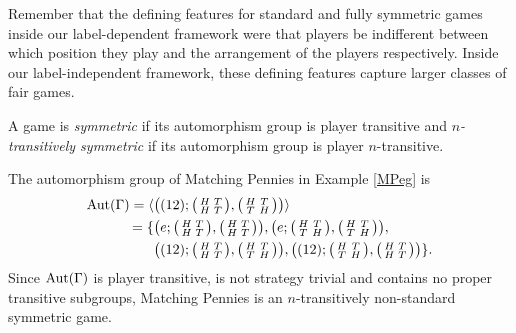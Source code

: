 Remember that the defining features for standard and fully symmetric games inside our label-dependent framework were that players be indifferent between which position they play and the arrangement of the players respectively. Inside our label-independent framework, these defining features capture larger classes of fair games.

\begin{definition}
	A game is \textit{symmetric} \cite{NoahXE} if its automorphism group is player transitive and \textit{$n$-transitively symmetric} if its automorphism group is player $n$-transitive.
\end{definition}

\begin{example} The automorphism group of Matching Pennies in Example \ref{MPeg} is \begin{align*}
		\operatorname*{Aut}(\Gamma) = \langle &\bigl((12) ; \bigl(\begin{smallmatrix} H & T \\ H & T \end{smallmatrix}\bigr), \bigl(\begin{smallmatrix} H & T \\ T & H \end{smallmatrix}\bigr)\bigr)\rangle \\
		= \{ &\bigl(e ; \bigl(\begin{smallmatrix} H & T \\ H & T \end{smallmatrix}\bigr), \bigl(\begin{smallmatrix} H & T \\ H & T \end{smallmatrix}\bigr)\bigr), 
		\bigl(e ; \bigl(\begin{smallmatrix} H & T \\ T & H \end{smallmatrix}\bigr), \bigl(\begin{smallmatrix} H & T \\ T & H \end{smallmatrix}\bigr)\bigr), \\
		&\bigl((12) ; \bigl(\begin{smallmatrix} H & T \\ H & T \end{smallmatrix}\bigr), \bigl(\begin{smallmatrix} H & T \\ T & H \end{smallmatrix}\bigr)\bigr),
		\bigl((12) ; \bigl(\begin{smallmatrix} H & T \\ T & H \end{smallmatrix}\bigr), \bigl(\begin{smallmatrix} H & T \\ H & T \end{smallmatrix}\bigr)\bigr) \}.
	\end{align*}
	Since $\operatorname*{Aut}(\Gamma)$ is player transitive, is not strategy trivial and contains no proper transitive subgroups, Matching Pennies is an $n$-transitively non-standard symmetric game.
\end{example}

